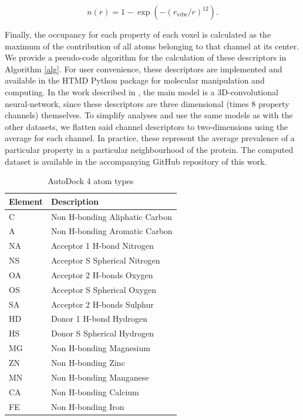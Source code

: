 \documentclass[10pt,a4paper,twoside]{book}
\begin{document}
\begin{equation}
    n(r) = 1-\exp\left(-(r_{\mathrm{vdw}}/r)^{12}\right).
\end{equation}

 Finally, the occupancy for each property of each voxel is calculated as the maximum of the contribution of all atoms belonging to that channel at its center. We provide a pseudo-code algorithm for the calculation of these descriptors in Algorithm \ref{alg}. For user convenience, these descriptors are implemented and available in the HTMD \cite{Doerr2016} Python package for molecular manipulation and computing. In the work described in \cite{Jimenez2017}, the main model is a 3D-convolutional neural-network, since these descriptors are three dimensional (times 8 property channels) themselves. To simplify analyses and use the same models as with the other datasets, we flatten said channel descriptors to two-dimensions using the average for each channel. In practice, these represent the average prevalence of a particular property in a particular neighbourhood of the protein. The computed dataset is available in the accompanying GitHub repository of this work.
 
 \begin{table}
\centering
\caption{AutoDock 4 atom types}
\label{table:autodockprop}
\begin{tabular}{@{}ll@{}}
\toprule
\textbf{Element} & \textbf{Description} \\ \midrule
C  & Non H-bonding Aliphatic Carbon     \\
A  & Non H-bonding Aromatic Carbon      \\
NA & Acceptor 1 H-bond Nitrogen         \\
NS & Acceptor S Spherical Nitrogen      \\
OA & Acceptor 2 H-bonds Oxygen          \\
OS & Acceptor S Spherical Oxygen        \\
SA & Acceptor 2 H-bonds Sulphur         \\
HD & Donor 1 H-bond Hydrogen            \\
HS & Donor S Spherical Hydrogen         \\
MG & Non H-bonding Magnesium            \\
ZN & Non H-bonding Zinc                 \\
MN & Non H-bonding Manganese            \\
CA & Non H-bonding Calcium              \\
FE & Non H-bonding Iron                 \\ \bottomrule
\end{tabular}
\end{table}
\end{document}
